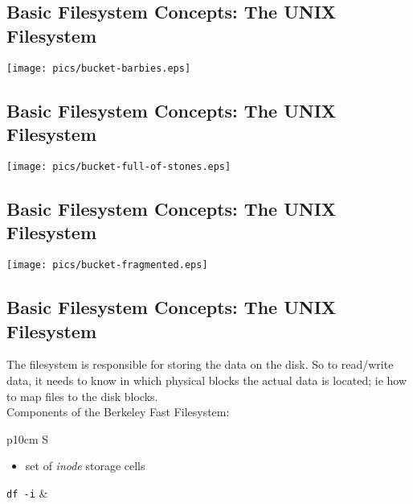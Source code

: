 \documentclass[xga]{xdvislides}
\begin{document}
\subsection{Basic Filesystem Concepts: The UNIX Filesystem}
\begin{center}
\texttt{[image: pics/bucket-barbies.eps]} \\
\end{center}

\subsection{Basic Filesystem Concepts: The UNIX Filesystem}
\vspace*{\fill}
\begin{center}
\texttt{[image: pics/bucket-full-of-stones.eps]} \\
\end{center}
\vspace*{\fill}

\subsection{Basic Filesystem Concepts: The UNIX Filesystem}
\vspace*{\fill}
\begin{center}
\texttt{[image: pics/bucket-fragmented.eps]} \\
\end{center}
\vspace*{\fill}

\subsection{Basic Filesystem Concepts: The UNIX Filesystem}
The filesystem is responsible for storing the data on the disk.
So to read/write data, it needs to know in which physical blocks the actual
data is located; ie how to map files to the disk blocks.
\\

Components of the Berkeley Fast Filesystem:
\\

\begin{tabular}{ p{10cm} S }
\begin{itemize}
	\item set of {\em inode} storage cells
\end{itemize}
{\tt df -i}
&  \\
\end{tabular}
\end{document}
